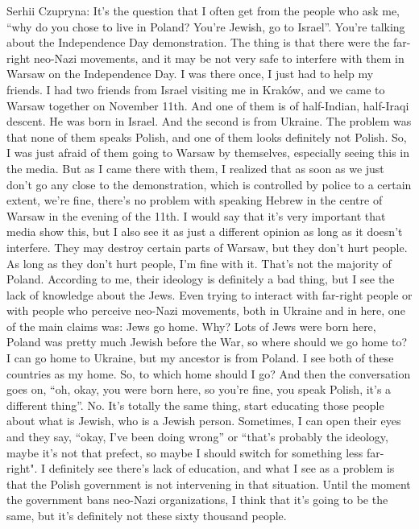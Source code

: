 Serhii Czupryna:  It’s the question that I often get from the people who ask me, “why do you chose to live in Poland? You’re Jewish, go to Israel”. You’re talking about the Independence Day demonstration. The thing is that there were the far-right neo-Nazi movements, and it may be not very safe to interfere with them in Warsaw on the Independence Day. I was there once, I just had to help my friends. I had two friends from Israel visiting me in Kraków, and we came to Warsaw together on  November 11th. And one of them is of half-Indian, half-Iraqi descent. He was born in Israel. And the second is from Ukraine. The problem was that none of them speaks Polish, and one of them looks definitely not Polish. So, I was just afraid of them going to Warsaw by themselves, especially seeing this in the media. But as I came there with them, I realized that as soon as we just don’t go any close to the demonstration, which is controlled by police to a certain extent, we’re fine, there’s no problem with speaking Hebrew in the centre of Warsaw in the evening of the 11th. I would say that it’s very important that media show this, but I also see it as just a different opinion as long as it doesn’t interfere. They may destroy certain parts of Warsaw, but they don’t hurt people. As long as they don’t hurt people, I’m fine with it. That’s not the majority of Poland. According to me, their ideology is definitely a bad thing, but I see the lack of knowledge about the Jews. Even trying to interact with far-right people or with people who perceive neo-Nazi movements, both in Ukraine and in here, one of the main claims was: Jews go home. Why? Lots of Jews were born here, Poland was pretty much Jewish before the War, so where should we go home to? I can go home to Ukraine, but my ancestor is from Poland. I see both of these countries as my home. So, to which home should I go? And then the conversation goes on, “oh, okay, you were born here, so you’re fine, you speak Polish, it’s a different thing”. No. It’s totally the same thing, start educating those people about what is Jewish, who is a Jewish person. Sometimes, I can open their eyes and they say, “okay, I’ve been doing wrong” or “that’s probably the ideology, maybe it’s not that prefect, so maybe I should switch for something less far-right". I definitely see there’s lack of education, and what I see as a problem is that the Polish government is not intervening in that situation. Until the moment the government bans neo-Nazi organizations, I think that it’s going to be the same, but it’s definitely not these sixty thousand people. 

